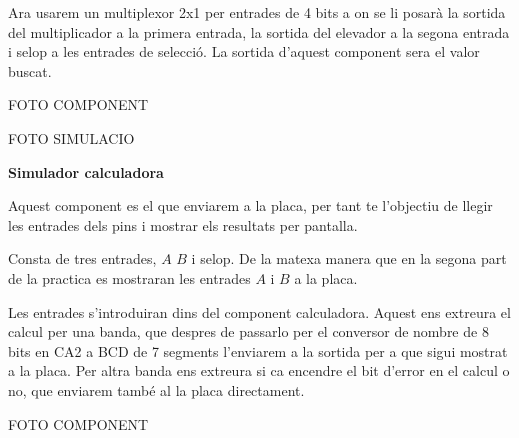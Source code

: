 \documentclass[12pt, a4papre]{article}
\begin{document}
	Ara usarem un multiplexor 2x1 per entrades de 4 bits a on se li posarà la sortida del multiplicador a la primera entrada, la sortida del elevador a la segona entrada i selop a les entrades de selecció. La sortida d'aquest component sera el valor buscat.
	
	\begin{center}
		FOTO COMPONENT
		
		FOTO SIMULACIO
	\end{center}
	
	\textbf{\large{Simulador calculadora}}
	
	Aquest component es el que enviarem a la placa, per tant te l'objectiu de llegir les entrades dels pins i mostrar els resultats per pantalla.
	
	Consta de tres entrades, $A$ $B$ i selop. De la matexa manera que en la segona part de la practica es mostraran les entrades $A$ i $B$ a la placa. 
	
	Les entrades s'introduiran dins del component calculadora. Aquest ens extreura el calcul per una banda, que despres de passarlo per el conversor de nombre de 8 bits en CA2 a BCD de 7 segments l'enviarem a la sortida per a que sigui mostrat a la placa. Per altra banda ens extreura si ca encendre el bit d'error en el calcul o no, que enviarem també al la placa directament.
	
	\begin{center}
		FOTO COMPONENT
	\end{center}
	
	
	
\end{document}
